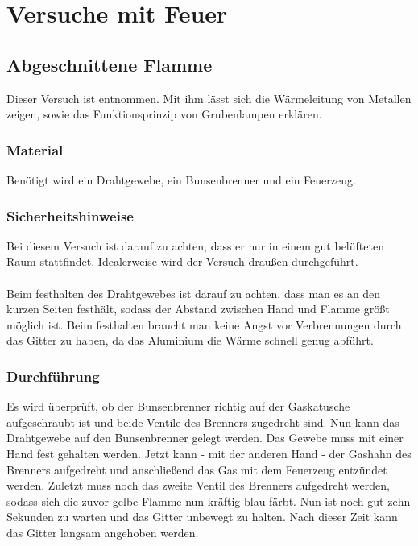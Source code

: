 \newpage
\chapter{Versuche mit Feuer}

\section{Abgeschnittene Flamme}

Dieser Versuch ist \cite{Physikanten} entnommen.
Mit ihm lässt sich die Wärmeleitung von Metallen zeigen, sowie das Funktionsprinzip von Grubenlampen erklären.

\subsection{Material}

Benötigt wird ein Drahtgewebe, ein Bunsenbrenner und ein Feuerzeug.

\subsection{Sicherheitshinweise}

Bei diesem Versuch ist darauf zu achten, dass er nur in einem gut belüfteten Raum stattfindet.
Idealerweise wird der Versuch draußen durchgeführt.\\
\\
Beim festhalten des Drahtgewebes ist darauf zu achten, dass man es an den kurzen Seiten festhält, sodass der Abstand zwischen Hand und Flamme größt möglich ist.
Beim festhalten braucht man keine Angst vor Verbrennungen durch das Gitter zu haben, da das Aluminium die Wärme schnell genug abführt.

\subsection{Durchführung}

Es wird überprüft, ob der Bunsenbrenner richtig auf der Gaskatusche aufgeschraubt ist und beide Ventile des Brenners zugedreht sind.
Nun kann das Drahtgewebe auf den Bunsenbrenner gelegt werden.
Das Gewebe muss mit einer Hand fest gehalten werden.
Jetzt kann - mit der anderen Hand - der Gashahn des Brenners aufgedreht und anschließend das Gas mit dem Feuerzeug entzündet werden.
Zuletzt muss noch das zweite Ventil des Brenners aufgedreht werden, sodass sich die zuvor gelbe Flamme nun kräftig blau färbt.
Nun ist noch gut zehn Sekunden zu warten und das Gitter unbewegt zu halten.
Nach dieser Zeit kann das Gitter langsam angehoben werden.

